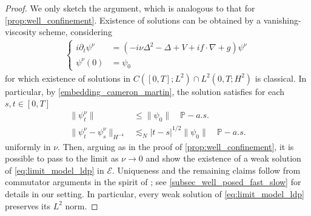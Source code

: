 \documentclass[a4paper,10pt]{amsart}
\theoremstyle{remark}
\numberwithin{equation}{section}
\begin{document}
\begin{proof}
   We only sketch the argument, which is analogous to that for
   \cref{prop:well_confinement}. Existence of solutions can be obtained by a
   vanishing-viscosity scheme, considering
   \begin{align}\label{viscous_LDP}
       \begin{cases}
         i \partial_t\psi^{\nu}&=(-i\nu\Delta^2-\Delta+V+if\cdot\nabla+g)\psi^{\nu} \\ \psi^{\nu}(0)&=\psi_0
     \end{cases}
   \end{align}
   for which existence of solutions in $C([0,T];L^2)\cap L^2(0,T;H^2)$ is classical. In particular, by \eqref{embedding_cameron_martin}, the solution satisfies for each $s,t\in [0,T]$
   \begin{align*}
       \|\psi^{\nu}_t\|&\leq \|\psi_0\|\quad \mathbb{P}-a.s.\\
	   \|\psi^\nu_t-\psi^\nu_s\|_{H^{-4}}
	   &\lesssim_N |t-s|^{1/2}\|\psi_0\|
	   \quad \mathbb{P}-a.s.
	   \end{align*}
	   uniformly in $\nu$. Then, arguing as in the proof of
	   \cref{prop:well_confinement}, it is possible to pass to the limit as
	   $\nu\rightarrow0$ and show the existence of a weak solution of
	   \eqref{eq:limit_model_ldp} in $\mathcal{E}$. Uniqueness and the
	   remaining claims follow from commutator arguments in the spirit of
	   \cite{diperna1989ordinary}; see \cref{subsec_well_posed_fast_slow}
	   for details in our setting. In particular, every weak solution of
	   \eqref{eq:limit_model_ldp} preserves its $L^2$ norm.
\end{proof}
\end{document}
